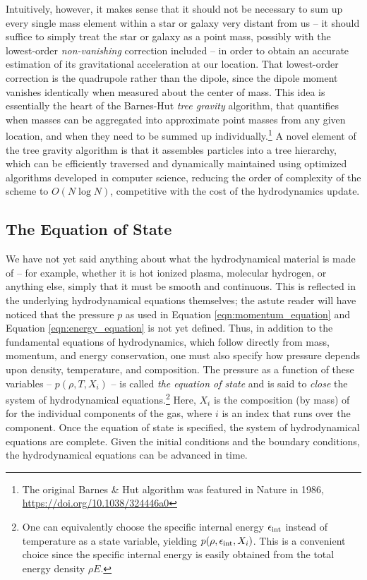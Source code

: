 \documentclass[notoc]{tufte-handout}
\begin{document}
Intuitively, however, it makes sense that it should not be necessary to sum up every single mass element within a star or galaxy very distant from us -- it should suffice to simply treat the star or galaxy as a point mass, possibly with the lowest-order {\it non-vanishing} correction included -- in order to obtain an accurate estimation of its gravitational acceleration at our location. That lowest-order correction is the quadrupole rather than the dipole, since the dipole moment vanishes identically when measured about the center of mass. This idea is essentially the heart of the Barnes-Hut {\it tree gravity} algorithm, that quantifies when masses can be aggregated into approximate point masses from any given location, and when they need to be summed up individually.\footnote {The original Barnes \& Hut algorithm was featured in Nature in 1986, \url {https://doi.org/10.1038/324446a0}}  A novel element of the tree gravity algorithm is that it assembles particles into a tree hierarchy, which can be efficiently traversed and dynamically maintained using optimized algorithms developed in computer science, reducing the order of complexity of the scheme to $O(N \log N)$, competitive with the cost of the hydrodynamics update.


\subsection{The Equation of State}

We have not yet said anything about what the hydrodynamical material is made of -- for example, whether it is hot ionized plasma, molecular hydrogen, or anything else, simply that it must be smooth and continuous. This is reflected in the underlying hydrodynamical equations themselves; the astute reader will have noticed that the pressure $p$ as used in Equation \ref {eqn:momentum_equation} and Equation \ref {eqn:energy_equation} is not yet defined. Thus, in addition to the fundamental equations of hydrodynamics, which follow directly from mass, momentum, and energy conservation, one must also specify how pressure depends upon density, temperature, and composition. The pressure as a function of these variables -- $p (\rho, T, X_i)$ -- is called {\it the equation of state} and is said to {\it close} the system of hydrodynamical equations.\footnote {One can equivalently choose the specific internal energy $\epsilon_{\rm int}$ instead of temperature as a state variable, yielding $p (\rho, \epsilon_{\rm int}, X_i)$. This is a convenient choice since the specific internal energy is easily obtained from the total energy density $\rho E$.}  Here, $X_i$ is the composition (by mass) of for the individual components of the gas, where $i$ is an index that runs over the component. Once the equation of state is specified, the system of hydrodynamical equations are complete. Given the initial conditions and the boundary conditions, the hydrodynamical equations can be advanced in time.
\end{document}
